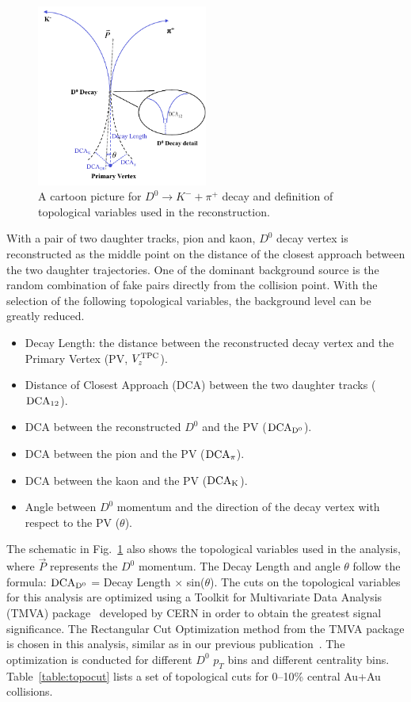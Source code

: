 \documentclass[%
 reprint,	
 amsmath,amssymb,
 aps,
 prc,
]{revtex4-1}
\begin{document}
\begin{figure}
\centering
\includegraphics[width=0.50\textwidth]{fig/D0carton.pdf}
\caption{A cartoon picture for $D^0\rightarrow K^-+\pi^+$ decay and definition of topological variables used in the reconstruction.}
\label{fig:D0carton} 
\end{figure}

With a pair of two daughter tracks, pion and kaon, $D^0$ decay vertex is reconstructed as the middle point on the distance of the closest approach between the two daughter trajectories. One of the dominant background source is the random combination of fake pairs directly from the collision point. With the selection of the following topological variables, the background level can be greatly reduced.

\begin{itemize}
  \item Decay Length: the distance between the reconstructed decay vertex and the Primary Vertex (PV, $V_{z}^{\rm TPC}$).
  \item Distance of Closest Approach (DCA) between the two daughter tracks ($\rm{DCA_{12}}$).
  \item DCA between the reconstructed $D^0$ and the PV ($\rm{DCA_{D^{0}}}$).
  \item DCA between the pion and the PV ($\rm{DCA_{\pi}}$).
  \item DCA between the kaon and the PV ($\rm{DCA_{K}}$).
  \item Angle between $D^0$ momentum and the direction of the decay vertex with respect to the PV ($\theta$).
\end{itemize}

The schematic in Fig.~\ref{fig:D0carton} also shows the topological variables used in the analysis, where $\vec{P}$ represents the $D^0$ momentum. The Decay Length and angle $\theta$ follow the formula: $\rm DCA_{D^{0}}$ = Decay Length $\times$ sin($\theta$). The cuts on the topological variables for this analysis are optimized using a Toolkit for Multivariate Data Analysis (TMVA) package~\cite{TMVA} developed by CERN in order to obtain the greatest signal significance. The Rectangular Cut Optimization method from the TMVA package is chosen in this analysis, similar as in our previous publication~\cite{Star_D_v2}. The optimization is conducted for different $D^0$ $p_{T}$ bins and different centrality bins. Table~\ref{table:topocut} lists a set of topological cuts for 0--10\% central Au+Au collisions.
\end{document}
